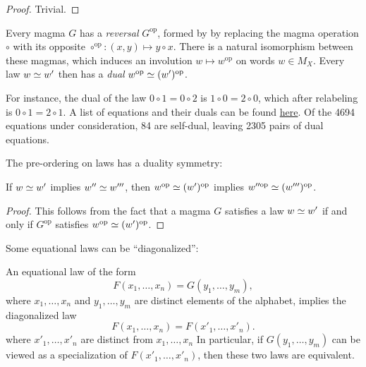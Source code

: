 \begin{proof} Trivial.
\end{proof}

Every magma $G$ has a \emph{reversal} $G^{\mathrm{op}}$, formed by by replacing the magma operation $\circ$ with its opposite $\circ^{\mathrm{op}}:(x,y) \mapsto y \circ x$. There is a natural isomorphism between these magmas, which induces an involution $w \mapsto w^{\mathrm{op}}$ on words $w \in M_X$.  Every law $w  \simeq  w'$ then has a \emph{dual} $w^{\mathrm{op}}  \simeq  (w')^{\mathrm{op}}$.

For instance, the dual of the law $0 \circ 1 = 0 \circ 2$ is $1 \circ 0 = 2 \circ 0$, which after relabeling is $0 \circ 1 = 2 \circ 1$.  A list of equations and their duals can be found \href{https://github.com/teorth/equational_theories/blob/main/data/dual_equations.md}{here}.  Of the 4694 equations under consideration, 84 are self-dual, leaving 2305 pairs of dual equations.

The pre-ordering on laws has a duality symmetry:

\begin{lemma}\label{duality}  If $w  \simeq  w'$ implies $w''  \simeq  w'''$, then $w^{\mathrm{op}}  \simeq  (w')^{\mathrm{op}}$ implies $w''^{\mathrm{op}}  \simeq  (w''')^{\mathrm{op}}$.
\end{lemma}

\begin{proof} This follows from the fact that a magma $G$ satisfies a law $w  \simeq  w'$ if and only if $G^{\mathrm{op}}$ satisfies $w^{\mathrm{op}}  \simeq  (w')^{\mathrm{op}}$.
\end{proof}

Some equational laws can be ``diagonalized'':

\begin{theorem}[Diagonalization]\label{diag}  An equational law of the form
  \begin{equation}\label{prediag} F(x_1,\dots,x_n) = G(y_1,\dots,y_m),
  \end{equation}
  where $x_1,\dots,x_n$ and $y_1,\dots,y_m$ are distinct elements of the alphabet, implies the diagonalized law
$$ F(x_1,\dots,x_n) = F(x'_1,\dots,x'_n).$$
where $x'_1,\dots,x'_n$ are distinct from $x_1,\dots,x_n$
In particular, if $G(y_1,\dots,y_m)$ can be viewed as a specialization of $F(x'_1,\dots,x'_n)$, then these two laws are equivalent.
\end{theorem}

